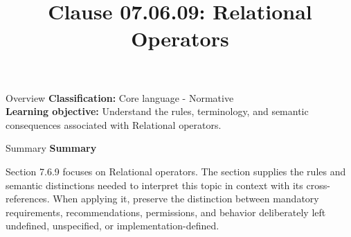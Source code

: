\documentclass[10pt,letterpaper]{article}
\title{Clause 07.06.09: Relational Operators}
\author{}
\date{}
\begin{document}
\maketitle
\begin{CornellOverviewBox}{Overview}
\textbf{Classification:} Core language - Normative\\[2pt]
\textbf{Learning objective:} Understand the rules, terminology, and semantic consequences associated with Relational operators.
\end{CornellOverviewBox}\begin{CornellSummaryBox}{Summary}
{\sffamily\bfseries\color{Accent} Summary}\par\vspace{3pt}Section 7.6.9 focuses on Relational operators. The section supplies the rules and semantic distinctions needed to interpret this topic in context with its cross-references. When applying it, preserve the distinction between mandatory requirements, recommendations, permissions, and behavior deliberately left undefined, unspecified, or implementation-defined.
\end{CornellSummaryBox}
\end{document}
